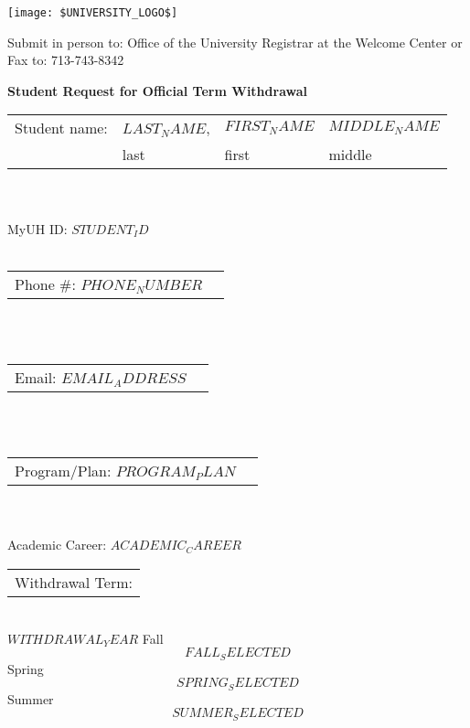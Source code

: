 \documentclass[11pt]{article}
\newcommand{\lastName}{$LAST_NAME$}
\newcommand{\firstName}{$FIRST_NAME$}
\newcommand{\middleName}{$MIDDLE_NAME$}
\newcommand{\studentID}{$STUDENT_ID$}
\newcommand{\phoneNumber}{$PHONE_NUMBER$}
\newcommand{\emailAddress}{$EMAIL_ADDRESS$}
\newcommand{\programPlan}{$PROGRAM_PLAN$}
\newcommand{\academicCareer}{$ACADEMIC_CAREER$}
\newcommand{\withdrawalYear}{$WITHDRAWAL_YEAR$}
\newcommand{\seasonFall}{$FALL_SELECTED$}
\newcommand{\seasonSpring}{$SPRING_SELECTED$}
\newcommand{\seasonSummer}{$SUMMER_SELECTED$}
\begin{document}
\thispagestyle{empty}

\begin{center}
  \texttt{[image: \$UNIVERSITY\_LOGO\$]}
  \vspace{1em}
\end{center}

\begin{minipage}{1\textwidth}
  Submit in person to:
  Office of the University Registrar at
  the Welcome Center
  or
  Fax to: 713-743-8342
\end{minipage}

\begin{center}
  \textbf{\Large Student Request for Official Term Withdrawal}
\end{center}

\noindent\begin{tabular}{@{}p{1.2in}p{1in}p{1in}p{1in}@{}} 
Student name: & \underline{\lastName}, & \underline{\firstName} & \underline{\middleName}\\
 & \scriptsize{last} & \scriptsize{first} & \scriptsize{middle}\\
\end{tabular}
\\\\
\hfill MyUH ID: \underline{\studentID}
\\\\
\noindent\begin{tabular}{@{}p{2in}p{2in}@{}}
  Phone \#:   \underline{\phoneNumber} \\
\end{tabular}
\\\\
\noindent\begin{tabular}{@{}p{3in}p{4.5in}@{}}
Email: \underline{\emailAddress} \\
\end{tabular}
\\\\
\noindent\begin{tabular}{@{}p{3in}p{4.5in}@{}}
Program/Plan:  \underline{\programPlan} \\
\end{tabular}
\\\\
\hfill Academic Career: \underline{\academicCareer}
\\

\noindent\begin{tabular}{@{}p{1.8in}@{}}
Withdrawal Term: \\
\end{tabular}
\\
\underline{\withdrawalYear} \hspace{0.2in} Fall $\seasonFall$ \hspace{0.2in} Spring $\seasonSpring$ \hspace{0.2in} Summer $\seasonSummer$
\end{document}
